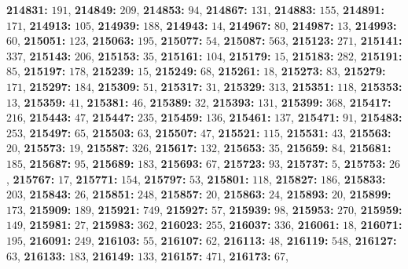 \textsf{\bfseries 214831:} $191$, \textsf{\bfseries 214849:} $209$, \textsf{\bfseries 214853:} $94$, \textsf{\bfseries 214867:} $131$, \textsf{\bfseries 214883:} $155$, \textsf{\bfseries 214891:} $171$, \textsf{\bfseries 214913:} $105$, \textsf{\bfseries 214939:} $188$, \textsf{\bfseries 214943:} $14$, \textsf{\bfseries 214967:} $80$, \textsf{\bfseries 214987:} $13$, \textsf{\bfseries 214993:} $60$, \textsf{\bfseries 215051:} $123$, \textsf{\bfseries 215063:} $195$, \textsf{\bfseries 215077:} $54$, \textsf{\bfseries 215087:} $563$, \textsf{\bfseries 215123:} $271$, \textsf{\bfseries 215141:} $337$, \textsf{\bfseries 215143:} $206$, \textsf{\bfseries 215153:} $35$, \textsf{\bfseries 215161:} $104$, \textsf{\bfseries 215179:} $15$, \textsf{\bfseries 215183:} $282$, \textsf{\bfseries 215191:} $85$, \textsf{\bfseries 215197:} $178$, \textsf{\bfseries 215239:} $15$, \textsf{\bfseries 215249:} $68$, \textsf{\bfseries 215261:} $18$, \textsf{\bfseries 215273:} $83$, \textsf{\bfseries 215279:} $171$, \textsf{\bfseries 215297:} $184$, \textsf{\bfseries 215309:} $51$, \textsf{\bfseries 215317:} $31$, \textsf{\bfseries 215329:} $313$, \textsf{\bfseries 215351:} $118$, \textsf{\bfseries 215353:} $13$, \textsf{\bfseries 215359:} $41$, \textsf{\bfseries 215381:} $46$, \textsf{\bfseries 215389:} $32$, \textsf{\bfseries 215393:} $131$, \textsf{\bfseries 215399:} $368$, \textsf{\bfseries 215417:} $216$, \textsf{\bfseries 215443:} $47$, \textsf{\bfseries 215447:} $235$, \textsf{\bfseries 215459:} $136$, \textsf{\bfseries 215461:} $137$, \textsf{\bfseries 215471:} $91$, \textsf{\bfseries 215483:} $253$, \textsf{\bfseries 215497:} $65$, \textsf{\bfseries 215503:} $63$, \textsf{\bfseries 215507:} $47$, \textsf{\bfseries 215521:} $115$, \textsf{\bfseries 215531:} $43$, \textsf{\bfseries 215563:} $20$, \textsf{\bfseries 215573:} $19$, \textsf{\bfseries 215587:} $326$, \textsf{\bfseries 215617:} $132$, \textsf{\bfseries 215653:} $35$, \textsf{\bfseries 215659:} $84$, \textsf{\bfseries 215681:} $185$, \textsf{\bfseries 215687:} $95$, \textsf{\bfseries 215689:} $183$, \textsf{\bfseries 215693:} $67$, \textsf{\bfseries 215723:} $93$, \textsf{\bfseries 215737:} $5$, \textsf{\bfseries 215753:} $26$, \textsf{\bfseries 215767:} $17$, \textsf{\bfseries 215771:} $154$, \textsf{\bfseries 215797:} $53$, \textsf{\bfseries 215801:} $118$, \textsf{\bfseries 215827:} $186$, \textsf{\bfseries 215833:} $203$, \textsf{\bfseries 215843:} $26$, \textsf{\bfseries 215851:} $248$, \textsf{\bfseries 215857:} $20$, \textsf{\bfseries 215863:} $24$, \textsf{\bfseries 215893:} $20$, \textsf{\bfseries 215899:} $173$, \textsf{\bfseries 215909:} $189$, \textsf{\bfseries 215921:} $749$, \textsf{\bfseries 215927:} $57$, \textsf{\bfseries 215939:} $98$, \textsf{\bfseries 215953:} $270$, \textsf{\bfseries 215959:} $149$, \textsf{\bfseries 215981:} $27$, \textsf{\bfseries 215983:} $362$, \textsf{\bfseries 216023:} $255$, \textsf{\bfseries 216037:} $336$, \textsf{\bfseries 216061:} $18$, \textsf{\bfseries 216071:} $195$, \textsf{\bfseries 216091:} $249$, \textsf{\bfseries 216103:} $55$, \textsf{\bfseries 216107:} $62$, \textsf{\bfseries 216113:} $48$, \textsf{\bfseries 216119:} $548$, \textsf{\bfseries 216127:} $63$, \textsf{\bfseries 216133:} $183$, \textsf{\bfseries 216149:} $133$, \textsf{\bfseries 216157:} $471$, \textsf{\bfseries 216173:} $67$, 
